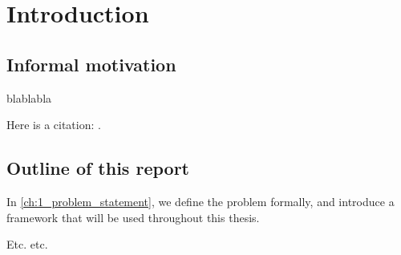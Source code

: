 \documentclass[../sample_report.tex]{subfiles}
\begin{document}
\setcounter{chapter}{-1}
\chapter{Introduction} \label{ch:0_introduction}

\section{Informal motivation}

blablabla

Here is a citation: \cite{kolmogorov_entropy_1959}.



\section{Outline of this report}

In \autoref{ch:1_problem_statement}, we define the problem formally, and introduce a framework that will be used throughout this thesis.

Etc. etc.
\end{document}
